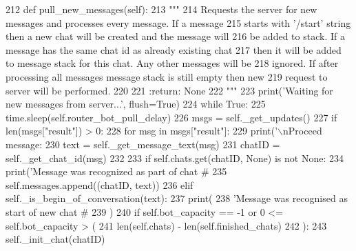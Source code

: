 \begin{DoxyCode}
212     \textcolor{keyword}{def }pull\_new\_messages(self):
213         \textcolor{stringliteral}{"""}
214 \textcolor{stringliteral}{        Requests the server for new messages and processes every message. If a message}
215 \textcolor{stringliteral}{        starts with '/start' string then a new chat will be created and the message will}
216 \textcolor{stringliteral}{        be added to stack. If a message has the same chat id as already existing chat}
217 \textcolor{stringliteral}{        then it will be added to message stack for this chat. Any other messages will be}
218 \textcolor{stringliteral}{        ignored. If after processing all messages message stack is still empty then new}
219 \textcolor{stringliteral}{        request to server will be performed.}
220 \textcolor{stringliteral}{}
221 \textcolor{stringliteral}{        :return: None}
222 \textcolor{stringliteral}{        """}
223         print(\textcolor{stringliteral}{'Waiting for new messages from server...'}, flush=\textcolor{keyword}{True})
224         \textcolor{keywordflow}{while} \textcolor{keyword}{True}:
225             time.sleep(self.router\_bot\_pull\_delay)
226             msgs = self.\_get\_updates()
227             \textcolor{keywordflow}{if} len(msgs[\textcolor{stringliteral}{"result"}]) > 0:
228                 \textcolor{keywordflow}{for} msg \textcolor{keywordflow}{in} msgs[\textcolor{stringliteral}{"result"}]:
229                     print(\textcolor{stringliteral}{'\(\backslash\)nProceed message: %
230                     text = self.\_get\_message\_text(msg)
231                     chatID = self.\_get\_chat\_id(msg)
232 
233                     \textcolor{keywordflow}{if} self.chats.get(chatID, \textcolor{keywordtype}{None}) \textcolor{keywordflow}{is} \textcolor{keywordflow}{not} \textcolor{keywordtype}{None}:
234                         print(\textcolor{stringliteral}{'Message was recognized as part of chat #%
235                         self.messages.append((chatID, text))
236                     \textcolor{keywordflow}{elif} self.\_is\_begin\_of\_conversation(text):
237                         print(
238                             \textcolor{stringliteral}{'Message was recognised as start of new chat #%
239                         )
240                         \textcolor{keywordflow}{if} self.bot\_capacity == -1 \textcolor{keywordflow}{or} 0 <= self.bot\_capacity > (
241                             len(self.chats) - len(self.finished\_chats)
242                         ):
243                             self.\_init\_chat(chatID)
}}}
\end{DoxyCode}
